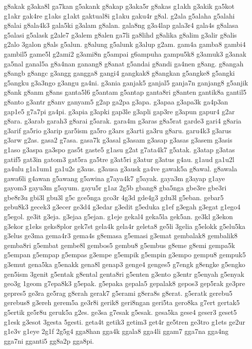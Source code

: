 {g8akak g3aka8l ga7kan g5akank g8akap g3aka5r g8akas g1akh g3akik ga5kot
g1akr gak4re g1aks g1akt gaktual8i g1aku gaku4r g8al. g2ala g5alaha
g5alahi g8alai g8ala4k3 gala5ki g3alam g8alan. gala8ng g3a4lap gala3r4
gala4s g8alasa g5alasi g5alask g2ale7 g3alem g8alen ga7li ga8lihd g8alika
g8alim g3alir g8alis g2alo 3galon g8als g5alun. g8alung g5alunk g3alup
g2am. gam4a gamba8 gambi4 gambil5 game5l g2ami2 g3ami8n g5ampai g6ampuha
gampu5k8 g3amuk3 g3anak ga5nal ganal5a g8a4nan ganang8 g8anat g5andai
g8andi ga4nen g8ang. g8angah g8angb g8angc g3angg gangga8 gangi4 gangkak8
g8angkan g5angke8 g5angki g5angku g3a3ngo g3angu ga4ni. g3ania ganjak5
ganjal5 ganja7n ganjang8 g5anjik g8ank g8anm g8ans ganta5l6 g5antam
g5antap ganta8ri g8anten gantik8a gantil5 g8anto g3antr g8anv ganyam5 g2ap
ga2pa g3apa. g3apaa g3apa3k ga4p3an gap1e5 g7a7pi ga4pi. g3apia g3apki
gap3le g3apli gap3re g3apun gapur4 g2ar g8ara. g3arab garah3 g8arai
g5arak. gara4m g3aras g8a5rat garde3 gari4 g8aria g3arif ga5rio g3arip
gar5ism ga5ro g3ars g3arti ga3ru g8aru. garu4k3 g3arus g3arw g2as. gasa2
g7asa. gasa7k g3asal g3asam g3asap g3asas g3asem g3asis g1aso g3aspa
ga3spo gas5t gaste5 g1asu g2at g7ata4k7 g5atak. g3atap g3atas gatif5
gat3in gatom3 gat5ra ga5tre g3at5ri g3atur g3atus g4au. g1aud ga1u2l
ga4ulu g1a1um1 ga1u2s g3aus. g3ausa g3ausk ga4ve gawak5a g8awal. g8awala
gawa6li g4awan g5awang g5awina g7aya4k7 g5ayak. gaya3m g3ayap g1aye gayom3
gayu3m g5ayum. gayu5r g1az 2g5b gbang8 gba5nga gbe3re gbe3ri gbe8r3u gbi3l
gbu3l g5c gce5nga gco3r 4g3d gde4g3 gdu3l g5eban. gebar5 gebu8k3 gecek3
g3ecer ge3d4 g3edar g3edit g5eduka g1ef g3egah g3egat g1ego4 g5egol. ge3it
g3eja. g3ejaa g5ejan. g1eje gekal4 geka5la gek5an. ge3kl g3ekon g3ekor
g1eks geks8plor gek7st gela4k gela4r geleta8 ge5li 3gelia g5elokk g5elu5ka
g3elus ge3ma gema4r3 gema4s g8emasa g5emasi g3emat gembalak8 gembalik8
gemba8ri g5embat gembe8l gembos5 gembu8 g5embus g8eme g8emi gempa5k
g5empan g5empap g5empas g3empe g5empik g5empin g3empo gempu8 gempuk5
g3emut gena5ka g5enakk gena8l genap3 genge4 genges5 g7engk g8engke g5engko
gen5ism 3genit g5entak g8ental genta8ri g5enten g3ento g3entr g5enyah
g5enyak geo3g 1geom g7epa8k3 g5epak. g5epaka gepala5 gepalak8 gepos3
gep5rak ge3pre gepres5 ge3ra ge5rag g8erah gerak7 g5erami g8era8s g8erat.
g5eratk gerebu5 gerebus8 g3ereh gerem5a ge3r8i gerik8 geri8ngan geri5ta
gero8ka g7ert gertak5 g5ertik ge5r8u geruk5a g2es. ge3sa g7esak g5esak.
gesa5ka gese4 geser3 geset5 g1esk g3esot 3gesta 5gesti. geta4t getik3
getim3 get4r ge5tren ge3tro g1ets ge2ur g1e3v g1eye 2g1f 2g5g4 gga8han
gga4k ggala8 gga4li ggam7 gga7na gga4ng gga7ni gganti5 gg8a2p gga8pi.
}
